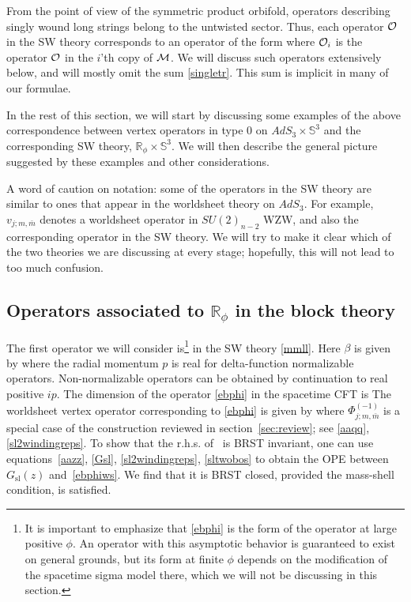 \documentclass[12pt]{article}
\def\sl{\text{sl}}
\def\ST{{\sst\it\! ST}}
\def\half{\frac12}
\def\MM{{\mathcal{M}}}
\def\OO{{\mathcal{O}}}
\newcommand{\bR}{{\mathbb R}}
\newcommand{\bS}{{\mathbb S}}
\numberwithin{equation}{section}
\def\sst{\scriptscriptstyle}
\def\half{\frac12}
\def\MM{{\cal M}}
\def\OO{{\cal O}}
\begin{document}
From the point of view of the symmetric product orbifold, operators describing singly wound long strings belong to the untwisted sector. Thus, each operator $\OO$ in the SW theory corresponds to an operator of the form 
\eqn[singletr]{\sum_{i=1}^p\OO_i~,}
where $\OO_i$ is the operator $\OO$ in the $i$'th copy of $\MM$. We will discuss such operators extensively below, and will mostly omit the sum \eqref{singletr}. This sum is implicit in many of our formulae. 



In the rest of this section, we will start by discussing some examples of the above correspondence between vertex operators in type 0 on $AdS_3\times \bS^3$ and the corresponding SW theory, $\bR_\phi\times \bS^3$. We will then describe the general picture suggested by these examples and other considerations.

A word of caution on notation: some of the operators in the SW theory are similar to ones that appear in the worldsheet theory on $AdS_3$. For example, $v_{j;m,\bar m}$ denotes a worldsheet operator in $SU(2)_{n-2}$ WZW, and also the corresponding operator in the SW theory. We will try to make it clear which of the two theories we are discussing at every stage; hopefully, this will not lead to too much confusion. 



\subsection{Operators associated to \texorpdfstring{$\bR_\phi$}{} in the block theory}
\label{sec:phiops}

The first operator we will consider is\footnote{It is important to emphasize that \eqref{ebphi} is the form of the operator at large positive $\phi$. An operator with this asymptotic behavior is guaranteed to exist on general grounds, but its form at finite $\phi$ depends on the modification of the spacetime sigma model there, which we will not be discussing in this section.} 
in the SW theory \eqref{mmll}. Here $\beta$ is given by 
where the radial momentum $p$ is real for delta-function normalizable operators. Non-normalizable operators can be obtained by continuation to real positive $ip$. The dimension of the operator \eqref{ebphi} in the spacetime CFT is 
\eqn[dimexp]{h_{\ST}=\bar h_{\ST} = -\half \beta(\beta+Q_\ell)= \frac{p^2}{2}+\frac{Q_\ell^2}{8} ~.}
The worldsheet vertex operator corresponding to \eqref{ebphi} is given by 
\eqn[ebphiws]{e^{\beta\phi}~~\longleftrightarrow~~e^{-\varphi-\bar\varphi} \, e^{i(H_\sl+\bar H_\sl)} \, \Phi_{j;m,\bar m}^{(-1)}~,}
where $\Phi_{j;m,\bar m}^{(-1)}$ is a special case of the construction reviewed in section~\ref{sec:review}; see \eqref{aaqq}, \eqref{sl2windingreps}. 
To show that the r.h.s. of \ebphiws\ is BRST invariant, one can use equations~\eqref{aazz}, \eqref{Gsl}, \eqref{sl2windingreps}, \eqref{sltwobos} to obtain the OPE between $G_\sl(z)$ and~\eqref{ebphiws}. We find that it is BRST closed, provided the mass-shell condition,
is satisfied.
\end{document}
